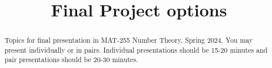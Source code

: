 \documentclass[handout,hints]{xourse}
\title{Final Project options}
\begin{document}
\begin{abstract} %
Topics for final presentation in MAT-255 Number Theory, Spring 2024. You may present individually or in pairs. Individual presentations should be 15-20 minutes and pair presentations should be 20-30 minutes. 
\end{abstract}  

\chapterstyle
{}
\sectionstyle  

\end{document}
